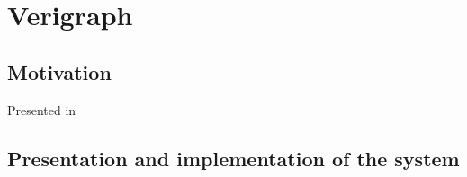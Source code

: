 \chapter{Verigraph}


\section{Motivation}
Presented in~\cite{BezerraETMF2016,Costa2016, CostaETMF2016}


\section{Presentation and implementation of the system}
